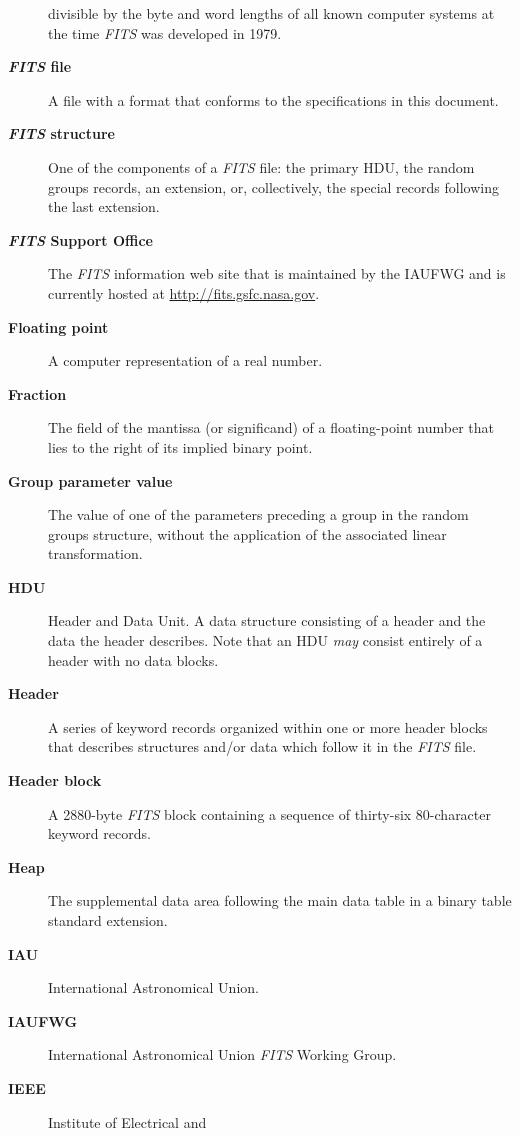 \documentclass[onecolumn]{aa}
\begin{document}
\begin{description}
divisible by the byte and word lengths of all known computer systems at the time
{\em FITS\/} was developed in 1979.
\item[\bf {\em\bf FITS} file] A file with a format that conforms to the 
            specifications in this document.
\item[\bf {\em\bf FITS} structure] One of the 
               components of a {\em FITS\/} file: 
               the primary HDU, 
               the random groups records, an 
               extension, or, collectively, 
               the special records following 
               the last extension.
\item[\bf {\em\bf FITS} Support Office] The {\em FITS\/} information
web site that is maintained by the IAUFWG and is currently hosted
at \url{http://fits.gsfc.nasa.gov}.
\item[\bf Floating point] A computer representation of a real number.
\item[\bf Fraction]The field of the mantissa
              (or significand) of a floating-point number that lies to
              the right of its implied binary point.   
\item[\bf Group parameter value] The 
     value of one of the parameters preceding a group in the random groups
     structure, without the application of the 
     associated linear transformation.
\item[\bf HDU] Header and Data Unit. A data structure 
       consisting of a
       header and the data the header describes. Note that an
       HDU {\em may} consist entirely of a header with no data blocks.
\item[\bf Header] A series of keyword records organized within 
       one or more 
       header blocks that describes structures 
       and/or data which follow it in the {\em FITS\/} file.
\item[\bf Header block]  A 2880-byte {\em FITS\/} block containing a sequence of thirty-six 
80-character keyword records. 
\item[\bf Heap] The supplemental data area following the main data table in 
       a binary table standard extension.
\item[\bf IAU] International Astronomical Union.
\item[\bf IAUFWG] 
       International Astronomical Union {\em FITS\/} Working Group.
\item[\bf IEEE] Institute of Electrical and 

\end{description}
\end{document}
